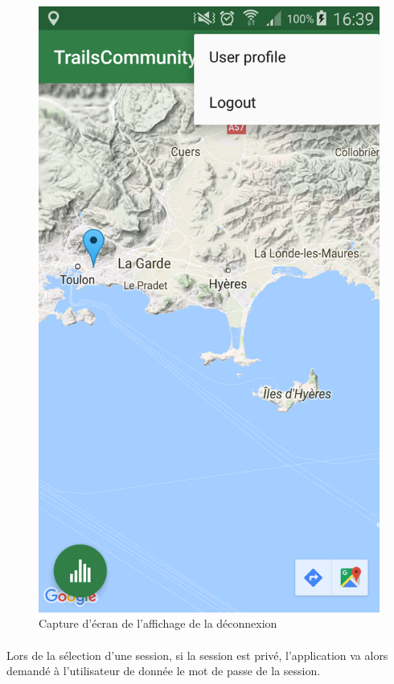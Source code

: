 \documentclass[titlepage, 12pt]{report}
\begin{document}
\begin{figure}[!h]
	\caption{Capture d'écran de l'affichage de la déconnexion}
	\label{screenshots_logout}
	\centering
	\includegraphics[scale=0.2]{Images/screenshots/logout.png}
\end{figure}

\clearpage

\paragraph{}Lors de la sélection d'une session, si la session est privé, l'application va alors demandé à l'utilisateur de donnée le mot de passe de la session.
\end{document}

